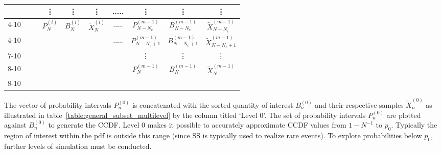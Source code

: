 \documentclass[journal]{IEEEtran}
\begin{document}
\begin{table*}[!t]
{\begin{tabular}{cccccccccc}
                             &                          & \multicolumn{1}{c|}{}   & \multicolumn{1}{c|}{\vdots} & \multicolumn{1}{c|}{\vdots} & \multicolumn{1}{c|}{\vdots} & \multicolumn{1}{c|}{.....} & \multicolumn{1}{c|}{\vdots} & \multicolumn{1}{c|}{\vdots} &  \multicolumn{1}{c|}{\vdots}      \\ \cline{4-10}
                             &                          & \multicolumn{1}{c|}{} & \multicolumn{1}{c|}{$P_{N}^{(i)}$} & \multicolumn{1}{c|}{$B_{N}^{(i)}$} & \multicolumn{1}{c|}{$\tilde{X}_{N}^{(i)}$} &   \multicolumn{1}{c|}{.....} & \multicolumn{1}{c|}{$P_{N-N_{c}}^{(m-1)}$} & \multicolumn{1}{c|}{$B_{N-N_{c}}^{(m-1)}$} & \multicolumn{1}{c|}{$\tilde{X}_{N-N_{c}}^{(m-1)}$}\\ \cline{4-10}
                             &                          &                         &                       &                       & \multicolumn{1}{c|}{} & \multicolumn{1}{c|}{.....} & \multicolumn{1}{c|}{$P_{N-N_{c}+1}^{(m-1)}$} & \multicolumn{1}{c|}{$B_{N-N_{c}+1}^{(m-1)}$} & \multicolumn{1}{c|}{$\tilde{X}_{N-N_{c}+1}^{(m-1)}$} \\ \cline{7-10} 
                             &                          &                         &                       &                       &                       & \multicolumn{1}{c|}{} & \multicolumn{1}{c|}{\vdots} & \multicolumn{1}{c|}{\vdots} & \multicolumn{1}{c|}{\vdots} \\ \cline{8-10}
                             &                          &                         &                       &                       &                       & \multicolumn{1}{c|}{} & \multicolumn{1}{c|}{$P_{N}^{(m-1)}$} & \multicolumn{1}{c|}{$B_{N}^{(m-1)}$} & \multicolumn{1}{c|}{$\tilde{X}_{N}^{(m-1)}$} \\ \cline{8-10} 
														
\end{tabular}
}
\caption{}
\label{table:general_subset_multilevel}
\end{table*}

\noindent The vector of probability intervals $P_{n}^{(0)}$ is concatenated with the sorted quantity of interest $B_{n}^{(0)}$ and their respective samples $\tilde{X}_{n}^{(0)}$ as illustrated in table~\ref{table:general_subset_multilevel} by the column titled `Level 0'. 
The set of probability intervals $P_{n}^{(0)}$ are plotted against $B_{n}^{(0)}$ to generate the CCDF. Level 0 makes it possible to accurately approximate CCDF values from $1-N^{-1}$ to $p_{0}$. Typically the region of interest within the pdf is outside this range (since SS is typically used to realize rare events). To explore probabilities below $p_{0}$, further levels of simulation must be conducted.
\end{document}
